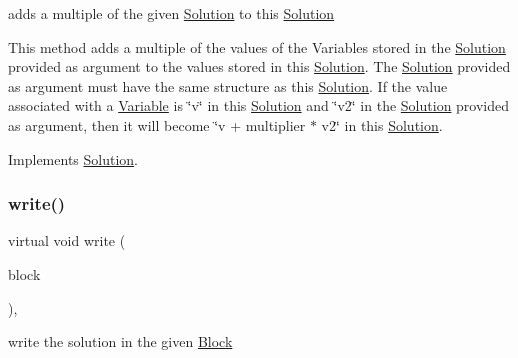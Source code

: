 adds a multiple of the given \mbox{\hyperlink{class_s_m_spp__di__unipi__it_1_1_solution}{Solution}} to this \mbox{\hyperlink{class_s_m_spp__di__unipi__it_1_1_solution}{Solution}} 

This method adds a multiple of the values of the Variables stored in the \mbox{\hyperlink{class_s_m_spp__di__unipi__it_1_1_solution}{Solution}} provided as argument to the values stored in this \mbox{\hyperlink{class_s_m_spp__di__unipi__it_1_1_solution}{Solution}}. The \mbox{\hyperlink{class_s_m_spp__di__unipi__it_1_1_solution}{Solution}} provided as argument must have the same structure as this \mbox{\hyperlink{class_s_m_spp__di__unipi__it_1_1_solution}{Solution}}. If the value associated with a \mbox{\hyperlink{class_s_m_spp__di__unipi__it_1_1_variable}{Variable}} is \char`\"{}v\char`\"{} in this \mbox{\hyperlink{class_s_m_spp__di__unipi__it_1_1_solution}{Solution}} and \char`\"{}v2\char`\"{} in the \mbox{\hyperlink{class_s_m_spp__di__unipi__it_1_1_solution}{Solution}} provided as argument, then it will become \char`\"{}v + multiplier $\ast$ v2\char`\"{} in this \mbox{\hyperlink{class_s_m_spp__di__unipi__it_1_1_solution}{Solution}}. 

Implements \mbox{\hyperlink{class_s_m_spp__di__unipi__it_1_1_solution_adc2450947fd142657637bf79d91505a9}{Solution}}.

\mbox{\label{class_s_m_spp__di__unipi__it_1_1_col_variable_solution_a99a9429b60ac714f7a4b5cbe4c0a96e4}} 
\subsubsection{\texorpdfstring{write()}{write()}}
{\footnotesize\ttfamily virtual void write (\begin{DoxyParamCaption}\item[{\mbox{\hyperlink{class_s_m_spp__di__unipi__it_1_1_block}{Block}} $\ast$const}]{block }\end{DoxyParamCaption})\hspace{0.3cm}{\ttfamily [override]}, {\ttfamily [virtual]}}



write the solution in the given \mbox{\hyperlink{class_s_m_spp__di__unipi__it_1_1_block}{Block}} 

